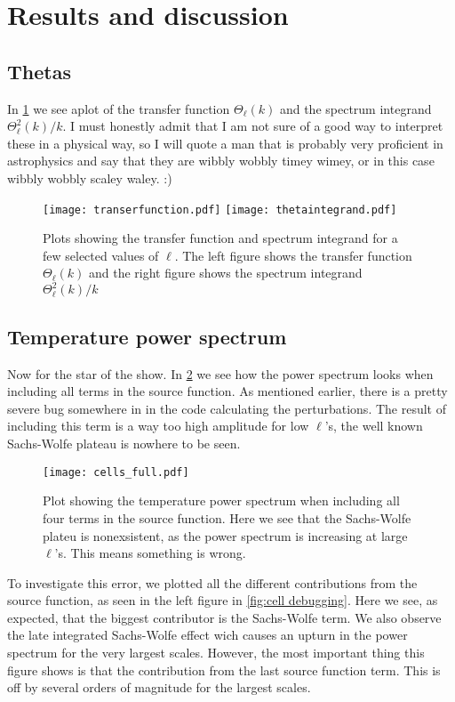 \documentclass[12pt]{article}
\begin{document}
\section{Results and discussion}
\subsection{Thetas}

In \cref{fig:thetas} we see aplot of the transfer function $\Theta_{\ell}(k)$ and the spectrum integrand $\Theta_{\ell}^2(k)/k$. I must honestly admit that I am not sure of a good way to interpret these in a physical way, so I will quote a man that is probably very proficient in astrophysics and say that they are wibbly wobbly timey wimey, or in this case wibbly wobbly scaley waley. :)

\begin{figure}[h]
    \centering
    \texttt{[image: transerfunction.pdf]}
    \texttt{[image: thetaintegrand.pdf]}  
    \caption{Plots showing the transfer function and spectrum integrand for a few selected values of $\ell$. The left figure shows the transfer function $\Theta_{\ell}(k)$ and the right figure shows the spectrum integrand $\Theta_{\ell}^2(k)/k$ }
    \label{fig:thetas}
\end{figure}


\subsection{Temperature power spectrum}

Now for the star of the show. In \cref{fig:cell full} we see how the power spectrum looks when including all terms in the source function. As mentioned earlier, there is a pretty severe bug somewhere in in the code calculating the perturbations. The result of including this term is a way too high amplitude for low $\ell$'s, the well known Sachs-Wolfe plateau is nowhere to be seen. 

\begin{figure}[h]
    \centering
    \texttt{[image: cells\_full.pdf]} 
    \caption{Plot showing the temperature power spectrum when including all four terms in the source function. Here we see that the Sachs-Wolfe plateu is nonexsistent, as the power spectrum is increasing at large $\ell$'s. This means something is wrong.}
    \label{fig:cell full}
\end{figure}

To investigate this error, we plotted all the different contributions from the source function, as seen in the left figure in \cref{fig:cell debugging}. Here we see, as expected, that the biggest contributor is the Sachs-Wolfe term. We also observe the late integrated Sachs-Wolfe effect wich causes an upturn in the power spectrum for the very largest scales. However, the most important thing this figure shows is that the contribution from the last source function term. This is off by several orders of magnitude for the largest scales. 
\end{document}
